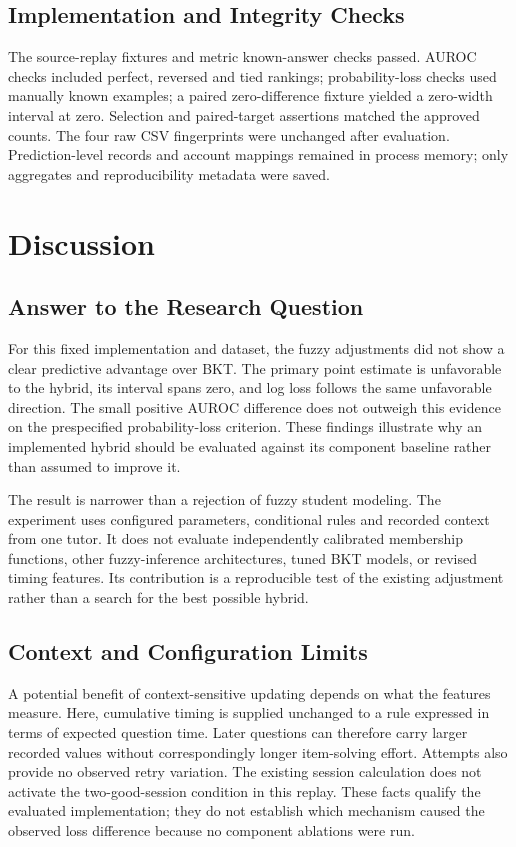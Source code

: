 \documentclass[conference]{IEEEtran}
\begin{document}
\subsection{Implementation and Integrity Checks}
The source-replay fixtures and metric known-answer checks passed. AUROC checks included perfect, reversed and tied rankings; probability-loss checks used manually known examples; a paired zero-difference fixture yielded a zero-width interval at zero. Selection and paired-target assertions matched the approved counts. The four raw CSV fingerprints were unchanged after evaluation. Prediction-level records and account mappings remained in process memory; only aggregates and reproducibility metadata were saved.

\section{Discussion}
\subsection{Answer to the Research Question}
For this fixed implementation and dataset, the fuzzy adjustments did not show a clear predictive advantage over BKT. The primary point estimate is unfavorable to the hybrid, its interval spans zero, and log loss follows the same unfavorable direction. The small positive AUROC difference does not outweigh this evidence on the prespecified probability-loss criterion. These findings illustrate why an implemented hybrid should be evaluated against its component baseline rather than assumed to improve it.

The result is narrower than a rejection of fuzzy student modeling. The experiment uses configured parameters, conditional rules and recorded context from one tutor. It does not evaluate independently calibrated membership functions, other fuzzy-inference architectures, tuned BKT models, or revised timing features. Its contribution is a reproducible test of the existing adjustment rather than a search for the best possible hybrid.

\subsection{Context and Configuration Limits}
A potential benefit of context-sensitive updating depends on what the features measure. Here, cumulative timing is supplied unchanged to a rule expressed in terms of expected question time. Later questions can therefore carry larger recorded values without correspondingly longer item-solving effort. Attempts also provide no observed retry variation. The existing session calculation does not activate the two-good-session condition in this replay. These facts qualify the evaluated implementation; they do not establish which mechanism caused the observed loss difference because no component ablations were run.
\end{document}
